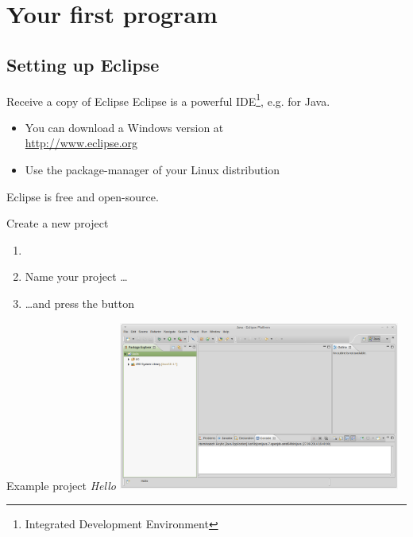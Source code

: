 \section{Your first program}
\subsection{Setting up Eclipse}

\begin{frame}{Receive a copy of Eclipse}
	Eclipse is a powerful IDE\footnote{Integrated Development Environment}, e.g. for Java.
	\begin{itemize}
		\item You can download a Windows version at \\
			\url{http://www.eclipse.org}
		\item Use the package-manager of your Linux distribution
	\end{itemize}
	Eclipse is free and open-source.
\end{frame}

\begin{frame}{Create a new project}
	\begin{enumerate}
		\item {}
		\item Name your project \dots
		\item \dots and press the  button
	\end{enumerate}
\end{frame}

\begin{frame}{Example project \emph{Hello}}
	\includegraphics[width=25em]{res/intro_eclipse.png}
\end{frame}

